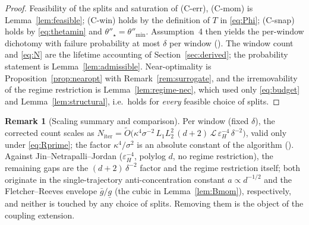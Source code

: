 \documentclass[11pt,a4paper]{article}
\theoremstyle{plain}
\theoremstyle{definition}
\newtheorem{remark}{Remark}
\newcommand{\eps}{\varepsilon}
\newcommand{\epsH}{\eps_{H}}
\newcommand{\hess}{\nabla^{2}}
\newcommand{\snap}{\tilde{x}}
\newcommand{\glow}{\underline{g}}
\newcommand{\LL}{\mathcal{L}}
\newcommand{\gup}{\bar g}
\newcommand{\Niter}{N_{\mathrm{iter}}}
\newcommand{\thetamin}{\theta''_{\min}}
\begin{document}
\begin{proof}
Feasibility of the splits and saturation of (C-err), (C-mom) is
Lemma~\ref{lem:feasible}; (C-win) holds by the definition of $T$ in
\eqref{eq:Phi}; (C-snap) holds by \eqref{eq:thetamin} and
$\theta''_\star = \thetamin$. Assumption~4 then yields the per-window
dichotomy with failure probability at most $\delta$ per window
(). The window count and \eqref{eq:N} are the
lifetime accounting of Section~\ref{sec:derived}; the probability statement
is Lemma~\ref{lem:admissible}. Near-optimality is
Proposition~\ref{prop:nearopt} with Remark~\ref{rem:surrogate}, and the
irremovability of the regime restriction is Lemma~\ref{lem:regime-nec},
which used only \eqref{eq:budget} and Lemma~\ref{lem:structural}, i.e.\
holds for \emph{every} feasible choice of splits.
\end{proof}

\begin{remark}[Scaling summary and comparison]\label{rem:scaling}
Per window (fixed $\delta$), the corrected count scales as
$\Niter = \widetilde{O}\!\big(\kappa^4\sigma^{-2}\,L_1 L_2^2\,(d+2)\,\LL\,
\epsH^{-4}\,\delta^{-2}\big)$, valid only under \eqref{eq:Rprime}; the
factor $\kappa^4/\sigma^2$ is an absolute constant of the algorithm
(\Cref{rem:optalpha}). Against Jin--Netrapalli--Jordan ($\epsH^{-4}$,
polylog $d$, no regime restriction), the remaining gaps are the
$(d+2)\,\delta^{-2}$ factor and the regime restriction itself; both
originate in the single-trajectory anti-concentration constant
$a \propto d^{-1/2}$ and the Fletcher--Reeves envelope $\gup/\glow$ (the
cubic in Lemma~\ref{lem:Bmom}), respectively, and neither is touched by any
choice of splits. Removing them is the object of the coupling extension.
\end{remark}




\end{document}
